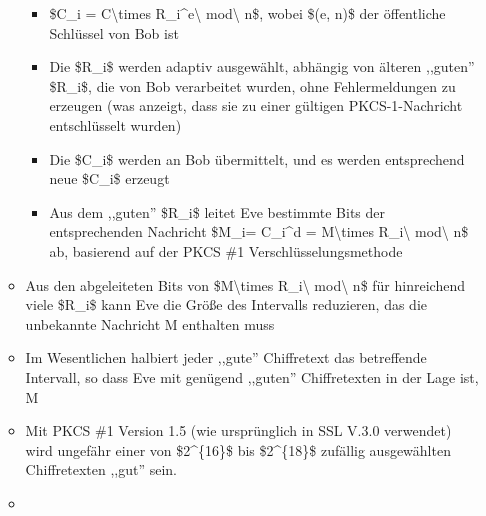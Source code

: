 \documentclass[a4paper]{article}
\begin{document}
\begin{multicols}{3}
\begin{itemize}
\begin{itemize}
                        \begin{itemize}
                            \item
                                  \$C\_i = C\textbackslash times R\_i\^{}e\textbackslash{}
                                  mod\textbackslash{} n\$, wobei \$(e, n)\$ der öffentliche
                                  Schlüssel von Bob ist
                            \item
                                  Die \$R\_i\$ werden adaptiv ausgewählt, abhängig von älteren
                                  ,,guten'' \$R\_i\$, die von Bob verarbeitet wurden, ohne
                                  Fehlermeldungen zu erzeugen (was anzeigt, dass sie zu einer
                                  gültigen PKCS-1-Nachricht entschlüsselt wurden)
                            \item
                                  Die \$C\_i\$ werden an Bob übermittelt, und es werden entsprechend
                                  neue \$C\_i\$ erzeugt
                            \item
                                  Aus dem ,,guten'' \$R\_i\$ leitet Eve bestimmte Bits der
                                  entsprechenden Nachricht \$M\_i= C\_i\^{}d = M\textbackslash times
                                  R\_i\textbackslash{} mod\textbackslash{} n\$ ab, basierend auf der
                                  PKCS \#1 Verschlüsselungsmethode
                        \end{itemize}
                  \item
                        Aus den abgeleiteten Bits von \$M\textbackslash times
                        R\_i\textbackslash{} mod\textbackslash{} n\$ für hinreichend viele
                        \$R\_i\$ kann Eve die Größe des Intervalls reduzieren, das die
                        unbekannte Nachricht M enthalten muss
                  \item
                        Im Wesentlichen halbiert jeder ,,gute'' Chiffretext das betreffende
                        Intervall, so dass Eve mit genügend ,,guten'' Chiffretexten in der
                        Lage ist, M
                  \item
                        Mit PKCS \#1 Version 1.5 (wie ursprünglich in SSL V.3.0 verwendet)
                        wird ungefähr einer von \$2\^{}\{16\}\$ bis \$2\^{}\{18\}\$ zufällig
                        ausgewählten Chiffretexten ,,gut'' sein.
                  \item

\end{itemize}
\end{itemize}
\end{multicols}
\end{document}
